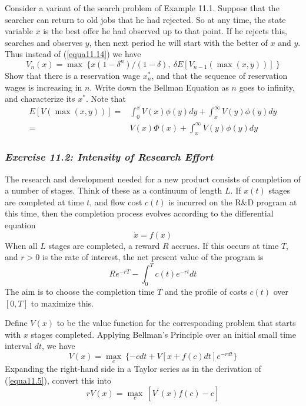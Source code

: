 Consider a variant of the search problem of Example 11.1. Suppose that the searcher can return to old jobs that he had rejected. So at any time, the state variable $x$ is the best offer he had observed up to that point. If he rejects this, searches and observes $y$, then next period he will start with the better of $x$ and $y$. Thus instead of (\ref{equa11.14}) we have
\begin{equation*}
  V_n(x) = \max \ \{ x(1-\delta^n)/(1-\delta), \ \delta E[V_{n-1}(\max (x,y)) ] \  \}
\end{equation*}
Show that there is a reservation wage $x_n^*$, and that the sequence of reservation wages is increasing in $n$. Write down the Bellman Equation as $n$ goes to infinity, and characterize its $x^*$. Note that
\begin{equation*}
\begin{array}{rl}
 E[V(\max(x,y))] = & \int_0^x V(x) \phi(y) dy + \int_x^\infty V(y) \phi(y) dy \\
                 = & V(x) \Phi(x) + \int_x^\infty V(y) \phi(y) dy 
\end{array}
\end{equation*}

\subsubsection*{\textit{Exercise 11.2: Intensity of Research Effort}}

The research and development needed for a new product consists of completion of a number of stages. Think of these as a continuum of length $L$. If $x(t)$ stages are completed at time $t$, and flow cost $c(t)$ is incurred on the R\&D program at this time, then the completion process evolves according to the differential equation
\begin{equation*}
  \dot{x} = f(x)
\end{equation*}
When all $L$ stages are completed, a reward $R$ accrues. If this occurs at time $T$, and $r>0$ is the rate of interest, the net present value of the program is 
\begin{equation*}
  R e^{-rT} - \int_0^T c(t) e^{-rt}dt
\end{equation*}
The aim is to choose the completion time $T$ and the profile of costs $c(t)$ over $[0,T]$ to maximize this.

Define $V(x)$ to be the value function for the corresponding problem that starts with $x$ stages completed. Applying Bellman's Principle over an initial small time interval $dt$, we have
\begin{equation*}
 V(x) = \mathop{\max}\limits_c \ \{ -cdt + V[x+ f(c)dt]e^{-rdt} \}
\end{equation*}
Expanding the right-hand side in a Taylor series as in the derivation of (\ref{equa11.5}), convert this into
\begin{equation} \label{equa11.30}
 r V(x) = \mathop{\max}\limits_c \ [ V^\prime(x)f(c) - c ]
\end{equation}

